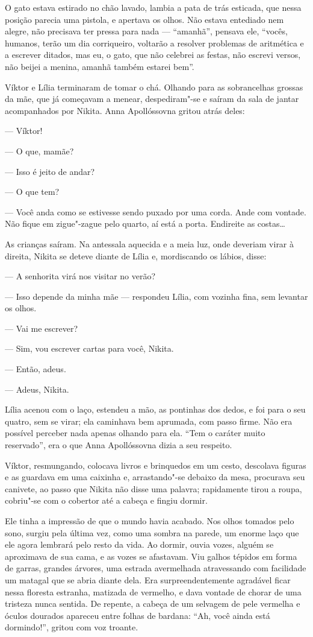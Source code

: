 O gato estava estirado no chão lavado, lambia a pata de trás esticada,
que nessa posição parecia uma pistola, e apertava os olhos. Não estava
entediado nem alegre, não precisava ter pressa para nada --- ``amanhã'',
pensava ele, ``vocês, humanos, terão um dia corriqueiro, voltarão a
resolver problemas de aritmética e a escrever ditados, mas eu, o gato,
que não celebrei as festas, não escrevi versos, não beijei a menina,
amanhã também estarei bem''.

Víktor e Lília terminaram de tomar o chá. Olhando para as sobrancelhas
grossas da mãe, que já começavam a menear, despediram"-se e saíram da
sala de jantar acompanhados por Nikita. Anna Apollóssovna gritou atrás
deles:

--- Víktor!

--- O que, mamãe?

--- Isso é jeito de andar?

--- O que tem?

--- Você anda como se estivesse sendo puxado por uma corda. Ande com
vontade. Não fique em zigue"-zague pelo quarto, aí está a porta.
Endireite as costas\ldots{}

As crianças saíram. Na antessala aquecida e a meia luz, onde deveriam
virar à direita, Nikita se deteve diante de Lília e, mordiscando os
lábios, disse:

--- A senhorita virá nos visitar no verão?

--- Isso depende da minha mãe --- respondeu Lília, com vozinha fina, sem
levantar os olhos.

--- Vai me escrever?

--- Sim, vou escrever cartas para você, Nikita.

--- Então, adeus.

--- Adeus, Nikita.

Lília acenou com o laço, estendeu a mão, as pontinhas dos dedos, e foi
para o seu quatro, sem se virar; ela caminhava bem aprumada, com passo
firme. Não era possível perceber nada apenas olhando para ela. ``Tem o
caráter muito reservado'', era o que Anna Apollóssovna dizia a seu
respeito.

Víktor, resmungando, colocava livros e brinquedos em um cesto, descolava
figuras e as guardava em uma caixinha e, arrastando"-se debaixo da mesa,
procurava seu canivete, ao passo que Nikita não disse uma palavra;
rapidamente tirou a roupa, cobriu"-se com o cobertor até a cabeça e
fingiu dormir.

Ele tinha a impressão de que o mundo havia acabado. Nos olhos tomados
pelo sono, surgiu pela última vez, como uma sombra na parede, um enorme
laço que ele agora lembrará pelo resto da vida. Ao dormir, ouvia vozes,
alguém se aproximava de sua cama, e as vozes se afastavam. Viu galhos
tépidos em forma de garras, grandes árvores, uma estrada avermelhada
atravessando com facilidade um matagal que se abria diante dela. Era
surpreendentemente agradável ficar nessa floresta estranha, matizada de
vermelho, e dava vontade de chorar de uma tristeza nunca sentida. De
repente, a cabeça de um selvagem de pele vermelha e óculos dourados
apareceu entre folhas de bardana: ``Ah, você ainda está dormindo!'',
gritou com voz troante.

